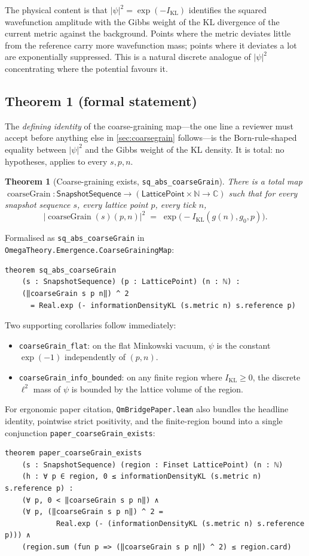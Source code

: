 \documentclass[11pt,a4paper,twoside]{article}
\newtheorem{theorem}{Theorem}[section]
\theoremstyle{definition}
\newcommand{\KL}{I_{\mathrm{KL}}}
\newcommand{\Cbb}{\mathbb{C}}
\newcommand{\Nbb}{\mathbb{N}}
\newcommand{\coarseGrain}{\operatorname{coarseGrain}}
\newcommand{\SnapSeq}{\mathsf{SnapshotSequence}}
\newcommand{\code}[1]{\texttt{#1}}
\begin{document}
The physical content is that $|\psi|^{2}=\exp(-\KL)$ identifies the
squared wavefunction amplitude with the Gibbs weight of the KL
divergence of the current metric against the background. Points where
the metric deviates little from the reference carry more wavefunction
mass; points where it deviates a lot are exponentially suppressed.
This is a natural discrete analogue of $|\psi|^{2}$ concentrating
where the potential favours it.

\subsection{Theorem 1 (formal statement)}\label{sec:T1}

The \emph{defining identity} of the coarse-graining map---the one
line a reviewer must accept before anything else in \cref{sec:coarsegrain}
follows---is the Born-rule-shaped equality between $|\psi|^{2}$ and
the Gibbs weight of the KL density. It is total: no hypotheses,
applies to every $s,p,n$.

\begin{theorem}[Coarse-graining exists, \code{sq\_abs\_coarseGrain}]\label{thm:T1}
There is a total map $\coarseGrain:\SnapSeq\to(\mathsf{LatticePoint}\times\Nbb\to\Cbb)$
such that for every snapshot sequence $s$, every lattice point $p$,
every tick $n$,
\[
\bigl|\coarseGrain(s)(p,n)\bigr|^{2}
 \;=\; \exp\!\bigl(-\KL(g(n),g_{0},p)\bigr).
\]
\end{theorem}

Formalised as \code{sq\_abs\_coarseGrain} in
\code{OmegaTheory.Emergence.CoarseGrainingMap}:
\begin{lstlisting}
theorem sq_abs_coarseGrain
    (s : SnapshotSequence) (p : LatticePoint) (n : ℕ) :
    (‖coarseGrain s p n‖) ^ 2
      = Real.exp (- informationDensityKL (s.metric n) s.reference p)
\end{lstlisting}

Two supporting corollaries follow immediately:
\begin{itemize}
\item \code{coarseGrain\_flat}: on the flat Minkowski vacuum, $\psi$ is
  the constant $\exp(-1)$ independently of $(p,n)$.
\item \code{coarseGrain\_info\_bounded}: on any finite region where
  $\KL\ge 0$, the discrete $\ell^{2}$ mass of $\psi$ is bounded by the
  lattice volume of the region.
\end{itemize}

For ergonomic paper citation, \code{QmBridgePaper.lean} also bundles
the headline identity, pointwise strict positivity, and the
finite-region bound into a single conjunction
\code{paper\_coarseGrain\_exists}:
\begin{lstlisting}
theorem paper_coarseGrain_exists
    (s : SnapshotSequence) (region : Finset LatticePoint) (n : ℕ)
    (h : ∀ p ∈ region, 0 ≤ informationDensityKL (s.metric n) s.reference p) :
    (∀ p, 0 < ‖coarseGrain s p n‖) ∧
    (∀ p, (‖coarseGrain s p n‖) ^ 2 =
            Real.exp (- (informationDensityKL (s.metric n) s.reference p))) ∧
    (region.sum (fun p => (‖coarseGrain s p n‖) ^ 2) ≤ region.card)
\end{lstlisting}
\end{document}
